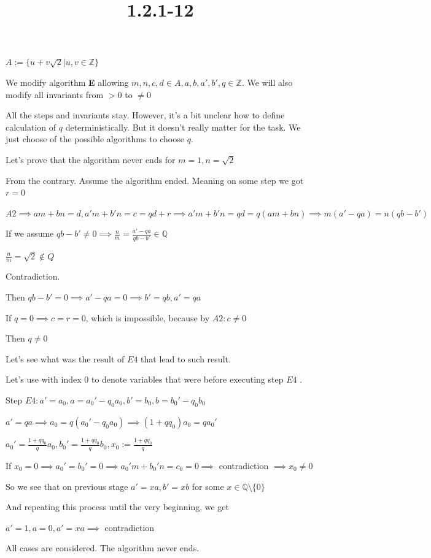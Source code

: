 \documentclass{article}
\title{1.2.1-12}
\begin{document}
\maketitle

$A := \{ u + v \sqrt{2} | u, v \in \mathbb{Z} \}$

We modify algorithm \textbf{E} allowing $m, n, c, d \in A, a, b, a', b', q \in \mathbb{Z}$. We will also modify all invariants from $> 0$ to $\neq 0$

All the steps and invariants stay. However, it's a bit unclear how to define calculation of $q$ deterministically. But it doesn't really matter for the task. We just choose of the possible algorithms to choose $q$.

Let's prove that the algorithm never ends for $m = 1, n = \sqrt{2}$

From the contrary. Assume the algorithm ended. Meaning on some step we got $r = 0$

$A2 \implies am + bn = d, a'm+b'n = c = qd + r \implies a'm+b'n = qd = q(am+bn) \implies m(a'-qa) = n(qb-b')$

If we assume $qb - b' \neq 0 \implies \frac{n}{m} = \frac{a'-qa}{qb-b'} \in \mathbb{Q}$

$\frac{n}{m} = \sqrt{2} \notin Q$

Contradiction.

Then $qb - b' = 0 \implies a' - qa = 0 \implies b' = qb, a' = qa$

If $q = 0 \implies c = r = 0$, which is impossible, because by $A2: c \neq 0$

Then $q \neq 0$

Let's see what was the result of $E4$ that lead to such result.

Let's use with index $0$ to denote variables that were before executing step $E4$ .

Step $E4: a' = a_0, a = a_0' - q_0a_0, b' = b_0, b = b_0' - q_0b_0$

$a'=qa \implies a_0 = q(a_0'-q_0a_0) \implies (1 + qq_0)a_0 = q a_0'$

$a_0' = \frac{1+qq_0}{q}a_0, b_0' = \frac{1+qq_0}{q}b_0, x_0 := \frac{1+qq_0}{q}$

If $x_0 = 0 \implies a_0'=b_0'=0 \implies a_0'm+b_0'n=c_0=0 \implies$ contradiction $\implies x_0 \neq 0$

So we see that on previous stage $a' = xa, b' = xb$ for some $x \in \mathbb{Q} \setminus \{ 0 \}$

And repeating this process until the very beginning, we get

$a'=1, a = 0, a'=xa \implies$ contradiction

All cases are considered. The algorithm never ends.
\end{document}
